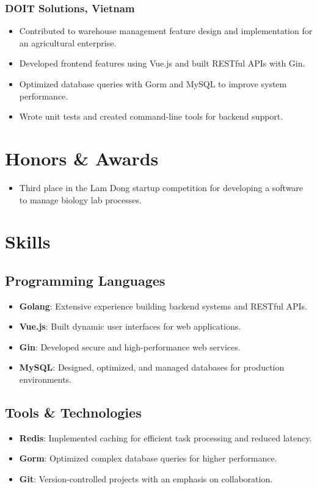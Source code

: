 \documentclass[11pt]{article}
\begin{document}
\subsubsection{DOIT Solutions, Vietnam}
\begin{itemize}
    \item[\checkmark] Contributed to warehouse management feature design and implementation for an agricultural enterprise.
    \item[\checkmark] Developed frontend features using Vue.js and built RESTful APIs with Gin.
    \item[\checkmark] Optimized database queries with Gorm and MySQL to improve system performance.
    \item[\checkmark] Wrote unit tests and created command-line tools for backend support.
\end{itemize}

\section{Honors \& Awards}
\begin{itemize}
    \item[\checkmark] Third place in the Lam Dong startup competition for developing a software to manage biology lab processes.
\end{itemize}

\section{Skills}
\subsection{Programming Languages}
\begin{itemize}
    \item[\checkmark] \textbf{Golang}: Extensive experience building backend systems and RESTful APIs.
    \item[\checkmark] \textbf{Vue.js}: Built dynamic user interfaces for web applications.
    \item[\checkmark] \textbf{Gin}: Developed secure and high-performance web services.
    \item[\checkmark] \textbf{MySQL}: Designed, optimized, and managed databases for production environments.
\end{itemize}

\subsection{Tools \& Technologies}
\begin{itemize}
    \item[\checkmark] \textbf{Redis}: Implemented caching for efficient task processing and reduced latency.
    \item[\checkmark] \textbf{Gorm}: Optimized complex database queries for higher performance.
    \item[\checkmark] \textbf{Git}: Version-controlled projects with an emphasis on collaboration.
\end{itemize}
\end{document}
